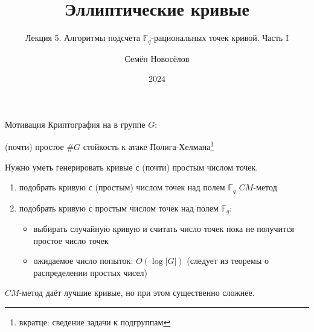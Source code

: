 \documentclass{beamer}
\title{Эллиптические кривые}
\subtitle{Лекция 5. Алгоритмы подсчета $\mathbb{F}_q$-рациональных точек кривой. Часть I}
\author{Семён Новосёлов}
\institute{БФУ им. И. Канта}
\date{2024}
\begin{document}
\frame{\titlepage}

\begin{frame}{Мотивация}
    Криптография на  в группе $G$:
    \begin{center}
    (почти) простое $\#G$ \structure{$\implies$} стойкость к атаке Полига-Хелмана\footnote{вкратце: сведение задачи к подгруппам}
 
    \vspace{1em}
    \structure{$\Downarrow$}
    \end{center}
    
    Нужно уметь генерировать кривые с (почти) простым числом точек.
\end{frame}

\begin{frame}
	\begin{enumerate}
		\item подобрать кривую с  (простым) числом точек над полем $\mathbb{F}_q$ \structure{$\implies$} $CM$-метод
		\vspace{0.5em}
		\item подобрать кривую с простым числом точек над полем $\mathbb{F}_q$:
		\begin{itemize}
			\item выбирать случайную кривую и считать число точек пока не получится простое число точек
			\item ожидаемое число попыток: $O(\log{|G|})$ (следует из теоремы о распределении простых чисел)
		\end{itemize}
	\end{enumerate}
	\vspace{0.5em}
	$CM$-метод даёт лучшие кривые, но при этом существенно сложнее.
\end{frame}
\end{document}
